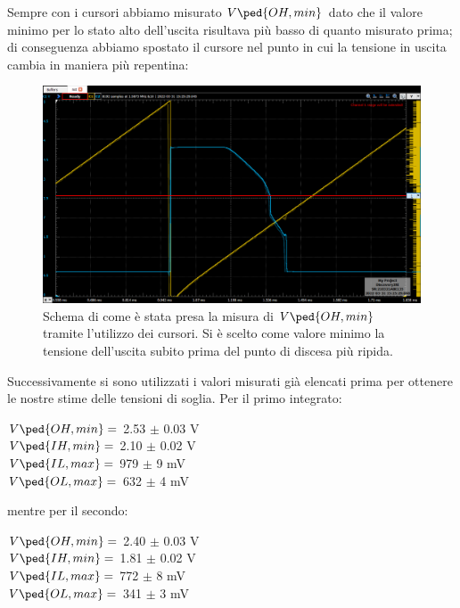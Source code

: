 \documentclass[10pt, a4paper, italian]{article}
\begin{document}
Sempre con i cursori abbiamo misurato $V\ped{OH, min}$ dato che il valore
minimo per lo stato alto dell'uscita risultava più basso di
quanto misurato prima; di conseguenza abbiamo spostato il cursore nel punto
in cui la tensione in uscita cambia in maniera più repentina:
\begin{figure}
\centering
	\includegraphics[scale=0.4]{trans1}
	\caption{Schema di come è stata presa la misura di $V\ped{OH, min}$ tramite
	l'utilizzo dei cursori. Si è scelto come valore minimo la tensione
	dell'uscita subito prima del punto di discesa più ripida.}
	\label{fig: trans1}
\end{figure}

Successivamente si sono utilizzati i valori misurati già elencati prima per
ottenere le nostre stime delle tensioni di soglia.
Per il primo integrato:
\begin{multicols}{2}
    \centering
    $V\ped{OH, min}=$ 2.53 $\pm$ 0.03 V\\
    $V\ped{IH, min}=$ 2.10 $\pm$ 0.02 V\\
    
    $V\ped{IL, max}=$ 979 $\pm$ 9 mV\\
    $V\ped{OL, max}=$ 632 $\pm$ 4 mV\\
\end{multicols}
mentre per il secondo:
\begin{multicols}{2}
    \centering
    $V\ped{OH, min}=$ 2.40 $\pm$ 0.03 V\\
    $V\ped{IH, min}=$ 1.81 $\pm$ 0.02 V\\
    
    $V\ped{IL, max}=$ 772 $\pm$ 8 mV\\
    $V\ped{OL, max}=$ 341 $\pm$ 3 mV\\
\end{multicols}
\end{document}
